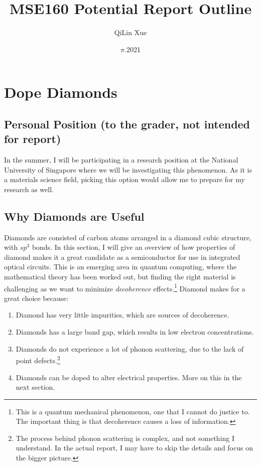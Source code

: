 \documentclass{article}
\title{MSE160 Potential Report Outline}
\author{QiLin Xue}
\date{$\pi$.2021}
\begin{document}
    \maketitle
    \tableofcontents
    \newpage
    \section{Dope Diamonds}
    \subsection*{Personal Position (to the grader, not intended for report)}
    In the summer, I will be participating in a research position at the National University of Singapore where we will be investigating this phenomenon. As it is a materials science field, picking this option would allow me to prepare for my research as well.
    \subsection{Why Diamonds are Useful}
    Diamonds are consisted of carbon atoms arranged in a diamond cubic structure, with $sp^3$ bonds. In this section, I will give an overview of how properties of diamond makes it a great candidate as a semiconductor for use in integrated optical circuits. This is an emerging area in quantum computing, where the mathematical theory has been worked out, but finding the right material is challenging as we want to minimize \textit{decoherence} effects.\footnote{This is a quantum mechanical phenomenon, one that I cannot do justice to. The important thing is that decoherence causes a loss of information.} Diamond makes for a great choice because\cite{test}:
    \begin{enumerate}
        \item Diamond has very little impurities, which are sources of decoherence.
        \item Diamonds has a large band gap, which results in low electron concentrations.
        \item Diamonds do not experience a lot of phonon scattering, due to the lack of point defects.\cite{phonon}\footnote{The process behind phonon scattering is complex, and not something I understand. In the actual report, I may have to skip the details and focus on the bigger picture.} 
        
        \item Diamonds can be doped to alter electrical properties. More on this in the next section.
    \end{enumerate}
\end{document}
